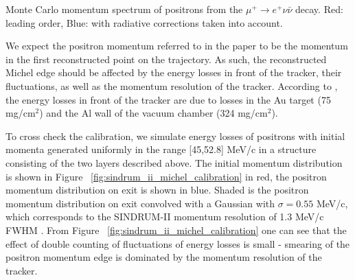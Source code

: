  {
  \label{fig:mu2e_5645_fig_001_mue3_decay}
  Monte Carlo momentum spectrum of positrons from the $\mu^+ \rightarrow e^+ \nu \bar{\nu}$
  decay. Red: leading order, Blue: with radiative corrections taken into account.
}
\vspace{0.1in}

We expect the positron momentum referred to in the paper
to be the momentum in the first reconstructed point on the trajectory. As such, the
reconstructed Michel edge should be affected by the energy losses in front of the
tracker, their fluctuations, as well as the momentum resolution of the tracker.
According to \cite{sindrum_ii:Bertl2006}, the energy losses in front of the tracker are due to 
losses in the Au target (75 mg/cm$^2$) and the Al wall of the vacuum chamber (324 mg/cm$^2$).

To cross check the calibration, we simulate energy losses of positrons with initial
momenta generated uniformly in the range [45,52.8] MeV/c in a structure consisting
of the two layers described above. The initial momentum distribution is shown
in Figure ~\ref{fig:sindrum_ii_michel_calibration}
in red, the positron momentum distribution on exit is shown in blue.
Shaded is the positron momentum distribution on exit convolved with
a Gaussian with $\sigma = 0.55$ MeV/c, which corresponds to the SINDRUM-II
momentum resolution of 1.3 MeV/c FWHM \cite{sindrum_ii:Kaulard1997_Thesis}.
From Figure ~\ref{fig:sindrum_ii_michel_calibration} one can see that the effect 
of double counting of fluctuations of energy losses is small - smearing of the
positron momentum edge is dominated by the momentum resolution of the tracker.

